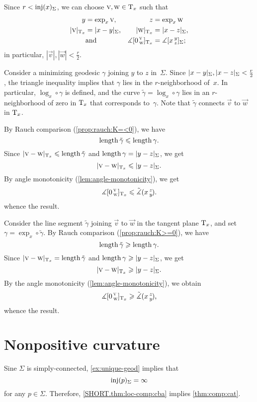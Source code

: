 Since $r<\mathop{\rm inj}\nolimits(x)_\Sigma$, we can choose $\text{\sc{v}},\text{\sc{w}}\in\mathrm{T}_x$ such that 
\begin{align*}
y&=\exp_x\vec v,
& 
z&=\exp_x\vec w
\\
|\vec v|_{\T_x}&=\dist{x}{y}\Sigma,&
|\vec w|_{\T_x}&=\dist{x}{z}\Sigma,
\\
&\text{and}
&\measuredangle\hinge 0{\vec v}{\vec w}_{\T_x}&=\measuredangle\hinge xyz_\Sigma;
\end{align*}
in particular, $|\vec v|, |\vec w|< \tfrac r2$.

Consider a minimizing geodesic $\gamma$ joining $y$ to $z$ in~$\Sigma$.
Since $\dist{x}{y}{\Sigma},\dist{x}{z}{\Sigma}\z<\tfrac r2$, the triangle inequality implies that $\gamma$ lies in the $r$-neighborhood of~$x$.
In particular, $\log_x\circ\gamma$ is defined, and the curve
$\tilde \gamma=\log_x\circ\gamma$ lies in an $r$-neighborhood of zero in $\mathrm{T}_x$ that corresponds to~$\gamma$.
Note that $\tilde\gamma$ connects $\vec v$ to $\vec w$ in $\mathrm{T}_x$.

By Rauch comparison (\ref{prop:rauch:K=<0}), we have
\[\mathop{\rm length}\nolimits \tilde \gamma\leqslant \mathop{\rm length}\nolimits\gamma.\]
Since $\dist{\vec v}{\vec w}{\T_x}\le\length\tilde \gamma$ and $\length\gamma=\dist{y}{z}{\Sigma}$, we get 
\[\dist{\vec v}{\vec w}{\T_x}\le \dist{y}{z}\Sigma.\]
By angle monotonicity (\ref{lem:angle-monotonicity}), we get
\[\measuredangle[0\,{}^{\text{\sc{v}}}_{\text{\sc{w}}}]_{\mathrm{T}_x}\leqslant \tilde\measuredangle(x\,{}^{z}_{y}\hspace{-0.2ex}).\]
whence the result.

Consider the line segment $\tilde \gamma$ joining $\vec v$ to $\vec w$ in the tangent plane $\mathrm{T}_x$, and set $\gamma=\exp_x\circ\tilde \gamma$.
By Rauch comparison (\ref{prop:rauch:K>=0}), we have
\[\mathop{\rm length}\nolimits \tilde \gamma\geqslant\mathop{\rm length}\nolimits\gamma.\]
Since $\dist{\vec v}{\vec w}{\T_x}=\length\tilde \gamma$ and $\length\gamma\ge\dist{y}{z}\Sigma$, we get 
\[\dist{\vec v}{\vec w}{\T_x}\ge \dist{y}{z}\Sigma.\]
By the angle monotonicity (\ref{lem:angle-monotonicity}), we obtain
\[\measuredangle[0\,{}^{\text{\sc{v}}}_{\text{\sc{w}}}]_{\mathrm{T}_x}\geqslant\tilde\measuredangle(x\,{}^{z}_{y}\hspace{-0.2ex}),\]
whence the result.
\qeds

\section{Nonpositive curvature}\label{sec:nonpos-comp}

Sine $\Sigma$ is simply-connected, \ref{ex:unique-geod} implies that 
\[\mathop{\rm inj}\nolimits(p)_\Sigma=\infty\]
for any $p\in\Sigma$.
Therefore, \ref{SHORT.thm:loc-comp:cba} implies \ref{thm:comp:cat}.
\qeds

